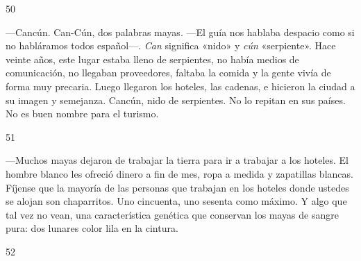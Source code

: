\documentclass[12pt,twoside,openright,a5paper]{book}
\begin{document}
\hrulefill \hspace{0.1cm}\decofourleft\hspace{0.2cm} 50 \hspace{0.2cm}\decofourright \hspace{0.1cm}\hrulefill

\nopagebreak

\vspace{0.5cm}

\nopagebreak

---Cancún. Can-Cún, dos palabras mayas. ---El guía nos
hablaba despacio como si no habláramos todos español---. \emph{Can} significa «nido»
y \emph{cún} «serpiente». Hace veinte años, este lugar estaba lleno de serpientes,
no había medios de comunicación, no llegaban proveedores, faltaba la
comida y la gente vivía de forma muy precaria. Luego llegaron los hoteles,
las cadenas, e hicieron la ciudad a su imagen y semejanza. Cancún, nido de
serpientes. No lo repitan en sus países. No es buen nombre para el turismo.

\vspace{0.5cm}

\hrulefill \hspace{0.1cm}\decofourleft\hspace{0.2cm} 51 \hspace{0.2cm}\decofourright \hspace{0.1cm}\hrulefill

\nopagebreak

\vspace{0.5cm}

\nopagebreak

---Muchos mayas dejaron de trabajar la tierra para ir a trabajar a los
hoteles.  El hombre blanco les ofreció dinero a fin de mes, ropa a medida y
zapatillas blancas.  Fíjense que la mayoría de las personas que trabajan
en los hoteles donde ustedes se alojan son chaparritos. Uno cincuenta, uno
sesenta como máximo. Y algo que tal vez no vean, una característica genética
que conservan los mayas de sangre pura: dos lunares color lila en la cintura.

\vspace{0.5cm}

\hrulefill \hspace{0.1cm}\decofourleft\hspace{0.2cm} 52 \hspace{0.2cm}\decofourright \hspace{0.1cm}\hrulefill
\end{document}
